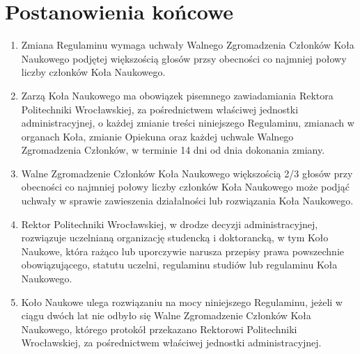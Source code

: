 \documentclass[12pt,a4paper]{article}
\begin{document}
\section{Postanowienia końcowe}
\begin{enumerate}
    \item Zmiana Regulaminu wymaga uchwały Walnego Zgromadzenia Członków Koła Naukowego podjętej większością głosów przsy obecności co najmniej połowy liczby członków Koła Naukowego.
    \item Zarzą Koła Naukowego ma obowiązek pisemnego zawiadamiania Rektora Politechniki Wrocławskiej, za pośrednictwem właściwej jednostki administracyjnej, o każdej zmianie treści niniejszego Regulaminu, zmianach w organach Koła, zmianie Opiekuna oraz każdej uchwale Walnego Zgromadzenia Członków, w terminie 14 dni od dnia dokonania zmiany. 
    \item Walne Zgromadzenie Członków Koła Naukowego większością 2/3 głosów przy obecności co najmniej połowy liczby członków Koła Naukowego może podjąć uchwały w sprawie zawieszenia działalności lub rozwiązania Koła Naukowego.
    \item Rektor Politechniki Wrocławskiej, w drodze decyzji administracyjnej, rozwiązuje uczelnianą organizację studencką i doktorancką, w tym Koło Naukowe, która rażąco lub uporczywie narusza przepisy prawa powszechnie obowiązującego, statutu uczelni, regulaminu studiów lub regulaminu Koła Naukowego.
    \item Koło Naukowe ulega rozwiązaniu na mocy niniejszego Regulaminu, jeżeli w ciągu dwóch lat nie odbyło się Walne Zgromadzenie Członków Koła Naukowego, którego protokół przekazano Rektorowi Politechniki Wrocławskiej, za pośrednictwem właściwej jednostki administracyjnej.
\end{enumerate}
\end{document}
